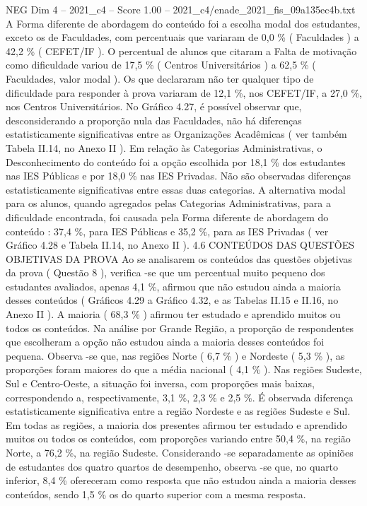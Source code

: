\begin{textsample}{NEG Dim 4 – 2021\_c4 – Score 1.00 – 2021\_c4/enade\_2021\_fis\_09a135ec4b.txt}
A Forma diferente de abordagem do conteúdo foi a escolha modal dos estudantes, exceto os de Faculdades, com percentuais que variaram de 0,0 \% ( Faculdades ) a 42,2 \% ( CEFET/IF ).
O percentual de alunos que citaram a Falta de motivação como dificuldade variou de 17,5 \% ( Centros Universitários ) a 62,5 \% ( Faculdades, valor modal ).
Os que declararam não ter qualquer tipo de dificuldade para responder à prova variaram de 12,1 \%, nos CEFET/IF, a 27,0 \%, nos Centros Universitários.
No Gráfico 4.27, é possível observar que, desconsiderando a proporção nula das Faculdades, não há diferenças estatisticamente significativas entre as Organizações Acadêmicas ( ver também Tabela II.14, no Anexo II ).
Em relação às Categorias Administrativas, o Desconhecimento do conteúdo foi a opção escolhida por 18,1 \% dos estudantes nas IES Públicas e por 18,0 \% nas IES Privadas.
Não são observadas diferenças estatisticamente significativas entre essas duas categorias.
A alternativa modal para os alunos, quando agregados pelas Categorias Administrativas, para a dificuldade encontrada, foi causada pela Forma diferente de abordagem do conteúdo : 37,4 \%, para IES Públicas e 35,2 \%, para as IES Privadas ( ver Gráfico 4.28 e Tabela II.14, no Anexo II ). 4.6 CONTEÚDOS DAS QUESTÕES OBJETIVAS DA PROVA Ao se analisarem os conteúdos das questões objetivas da prova ( Questão 8 ), verifica -se que um percentual muito pequeno dos estudantes avaliados, apenas 4,1 \%, afirmou que não estudou ainda a maioria desses conteúdos ( Gráficos 4.29 a Gráfico 4.32, e as Tabelas II.15 e II.16, no Anexo II ).
A maioria ( 68,3 \% ) afirmou ter estudado e aprendido muitos ou todos os conteúdos.
Na análise por Grande Região, a proporção de respondentes que escolheram a opção não estudou ainda a maioria desses conteúdos foi pequena.
Observa -se que, nas regiões Norte ( 6,7 \% ) e Nordeste ( 5,3 \% ), as proporções foram maiores do que a média nacional ( 4,1 \% ).
Nas regiões Sudeste, Sul e Centro-Oeste, a situação foi inversa, com proporções mais baixas, correspondendo a, respectivamente, 3,1 \%, 2,3 \% e 2,5 \%.
É observada diferença estatisticamente significativa entre a região Nordeste e as regiões Sudeste e Sul.
Em todas as regiões, a maioria dos presentes afirmou ter estudado e aprendido muitos ou todos os conteúdos, com proporções variando entre 50,4 \%, na região Norte, a 76,2 \%, na região Sudeste.
Considerando -se separadamente as opiniões de estudantes dos quatro quartos de desempenho, observa -se que, no quarto inferior, 8,4 \% ofereceram como resposta que não estudou ainda a maioria desses conteúdos, sendo 1,5 \% os do quarto superior com a mesma resposta.

\end{textsample}
